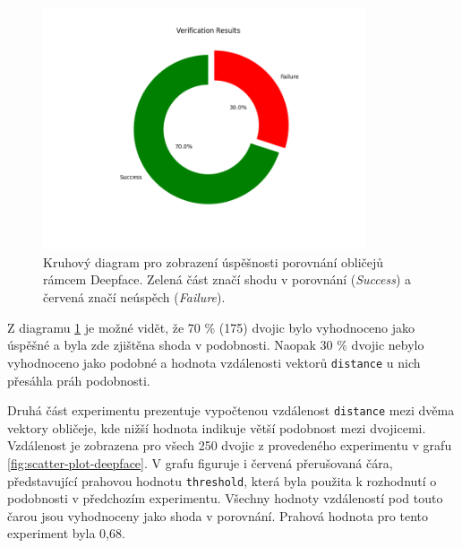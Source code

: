 \begin{figure}[H]
	\centering
	\includegraphics[width=0.85\textwidth]{obrazky-figures/deepface_verification_results.png}
	\caption{Kruhový diagram pro zobrazení úspěšnosti porovnání obličejů rámcem Deepface. Zelená část značí shodu v porovnání (\textit{Success}) a červená značí neúspěch (\textit{Failure}).}
        \label{fig:pie-chart-deepface}
\end{figure}

Z diagramu \ref{fig:pie-chart-deepface} je možné vidět, že 70 \% (175) dvojic bylo vyhodnoceno jako úspěšné a byla zde zjištěna shoda v podobnosti. Naopak 30 \% dvojic nebylo vyhodnoceno jako podobné a hodnota vzdálenosti vektorů \texttt{distance} u nich přesáhla práh podobnosti.

\bigskip

\noindent Druhá část experimentu prezentuje vypočtenou vzdálenost \texttt{distance} mezi dvěma vektory obličeje, kde nižší hodnota indikuje větší podobnost mezi dvojicemi. Vzdálenost je zobrazena pro všech 250 dvojic z provedeného experimentu v grafu \ref{fig:scatter-plot-deepface}. V grafu figuruje i červená přerušovaná čára, představující prahovou hodnotu \texttt{threshold}, která byla použita k rozhodnutí o podobnosti v předchozím experimentu. Všechny hodnoty vzdáleností pod touto čarou jsou vyhodnoceny jako shoda v porovnání. Prahová hodnota pro tento experiment byla 0,68.

